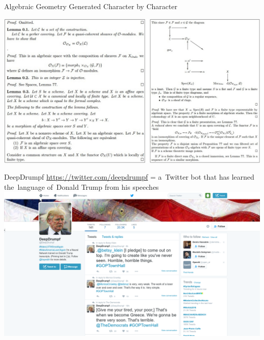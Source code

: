\documentclass{beamer}
\begin{document}
{    \begin{frame}{Algebraic Geometry Generated Character by Character}
      \begin{center}
        \includegraphics[width=\textwidth, height=\textheight, keepaspectratio]{../img/generating_latex.png}
      \end{center}
    \end{frame}
  }

  {
    \begin{frame}{DeepDrumpf}
      \url{https://twitter.com/deepdrumpf}
      \pause
      = a~Twitter bot that has learned the~language of~Donald Trump from his speeches 
      \includegraphics[width=\textwidth]{../img/DeepDrumpf.png}
    \end{frame}
  }
\end{document}
